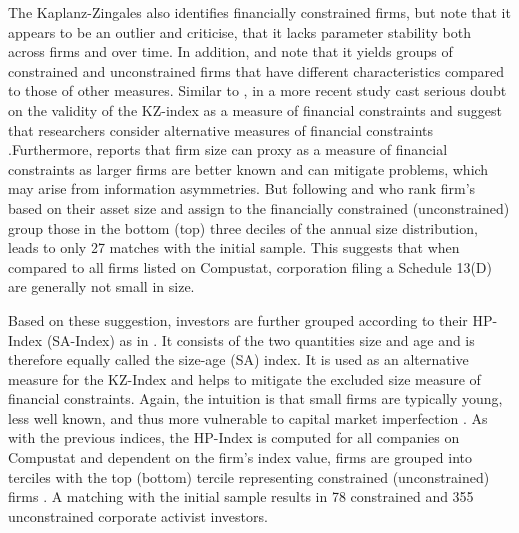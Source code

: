 \documentclass[12pt]{article}
\begin{document}
The Kaplanz-Zingales also identifies financially constrained firms, but \citet[p.279]{Farre-Mensa2016} note that it appears to be an outlier and \citet[p.533]{Whited2006} criticise, that it lacks parameter stability both across firms and over time. In addition, \citet[p.111]{Khatami2014} and \citet[p.1779]{Almeida2004} note that it yields groups of constrained and unconstrained firms that have different characteristics compared to those of other measures. Similar to \citet[p.546]{Whited2006}, in a more recent study \citet[p.1909]{hadlock2010} cast serious doubt on the validity of the KZ-index as a measure of financial constraints and suggest that researchers consider alternative measures of financial constraints \citep[p.1938]{hadlock2010}.Furthermore, \citet[p.15]{heller2015} reports that firm size can proxy as a measure of financial constraints as larger firms are better known and can mitigate problems, which may arise from information asymmetries. But following \citet[p.1790]{Almeida2004} and \citet[p.215]{Moeller2004} who rank firm's based on their asset size and assign to the financially constrained (unconstrained) group those in the bottom (top) three deciles of the annual size distribution, leads to only 27 matches with the initial sample. This suggests that when compared to all firms listed on Compustat, corporation filing a Schedule 13(D) are generally not small in size.\par
Based on these suggestion, investors are further grouped according to their HP-Index (SA-Index) as in \citet[p.1929]{hadlock2010}. It consists of the two quantities size and age and is therefore equally called the size-age (SA) index. It is used as an alternative measure for the KZ-Index and helps to mitigate the excluded size measure of financial constraints. Again, the intuition is that small firms are typically young, less well known, and thus more vulnerable to capital market imperfection \citep[p.1790]{Almeida2004}. As with the previous indices, the HP-Index is computed for all companies on Compustat and dependent on the firm's index value, firms are grouped into terciles with the top (bottom) tercile representing constrained (unconstrained) firms \citep[p.306]{Farre-Mensa2016}. A matching with the initial sample results in 78 constrained and 355 unconstrained corporate activist investors.\par
\end{document}
